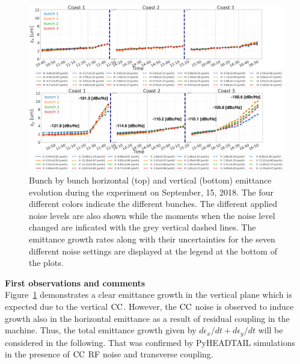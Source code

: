 \begin{figure}
   \centering
   \includegraphics[width=1.0\textwidth]{images/Ch5/MD5_overview_x_y.png}
   \caption{Bunch by bunch horizontal (top) and vertical (bottom) emittance evolution during the experiment on September, 15, 2018. The four different colors indicate the different bunches. The different applied noise levels are also shown while the moments when the noise level changed are inficated with the grey vertical dashed lines. The emittance growth rates along with their uncertainties for the seven different noise settings are displayed at the legend at the bottom of the plots.}
   \label{fig:MD5_overview_x_y}
\end{figure}
   
\textbf{First observations and comments}\\
Figure~\ref{fig:MD5_overview_x_y} demonstrates a clear emittance growth in the vertical plane which is expected due to the vertical ${\mathrm{CC}}$. However, the ${\mathrm{CC}}$ noise is observed to induce growth also in the horizontal emittance as a result of residual coupling in the machine. Thus, the total emittance growth given by $d\epsilon_x/dt + d\epsilon_y/dt$ will be considered in the following. That was confirmed by PyHEADTAIL simulations~\cite{Baudrenghien_HL-LHC19v6} in the presence of ${\mathrm{CC}}$ RF noise and transverse coupling. 



